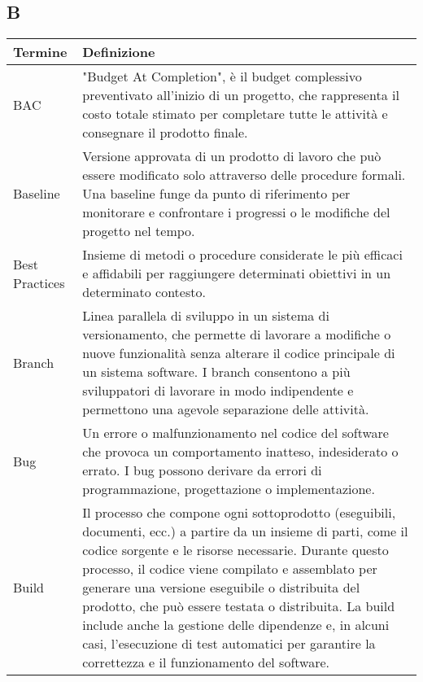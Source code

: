 \documentclass[10pt]{article}
\begin{document}
\subsection{B} %
\begin{longtable}{|>{\centering\arraybackslash}m{2.5cm}|>{\arraybackslash}m{12.5cm}|}
\hline
\rowcolor[gray]{0.8}
\textbf{Termine} & \textbf{Definizione}\\
\endhead
\hline
BAC & "Budget At Completion", è il budget complessivo preventivato all'inizio di un progetto, che rappresenta il costo totale stimato per completare tutte le attività e consegnare il prodotto finale.\\
\hline
Baseline & Versione approvata di un prodotto di lavoro che può essere modificato solo attraverso delle procedure formali. Una baseline funge da punto di riferimento per monitorare e confrontare i progressi o le modifiche del progetto nel tempo.\\
\hline
Best Practices & Insieme di metodi o procedure considerate le più efficaci e affidabili per raggiungere determinati obiettivi in un determinato contesto.\\
\hline
Branch & Linea parallela di sviluppo in un sistema di versionamento, che permette di lavorare a modifiche o nuove funzionalità senza alterare il codice principale di un sistema software. I branch consentono a più sviluppatori di lavorare in modo indipendente e permettono una agevole separazione delle attività.\\
\hline
Bug & Un errore o malfunzionamento nel codice del software che provoca un comportamento inatteso, indesiderato o errato. I bug possono derivare da errori di programmazione, progettazione o implementazione.\\
\hline
Build & Il processo che compone ogni sottoprodotto (eseguibili, documenti, ecc.) a partire da un insieme di parti, come il codice sorgente e le risorse necessarie. Durante questo processo, il codice viene compilato e assemblato per generare una versione eseguibile o distribuita del prodotto, che può essere testata o distribuita. La build include anche la gestione delle dipendenze e, in alcuni casi, l’esecuzione di test automatici per garantire la correttezza e il funzionamento del software.\\
\hline
\end{longtable}
\end{document}
